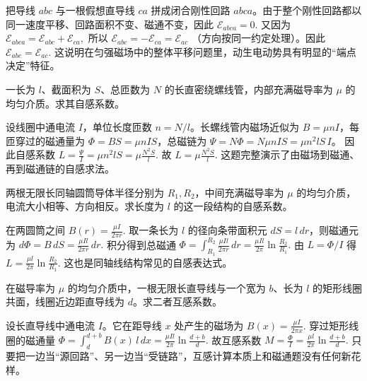 \documentclass[lang=cn,11pt]{elegantbook}
\begin{document}
\begin{solution}
把导线 \(abc\) 与一根假想直导线 \(ca\) 拼成闭合刚性回路 \(abca\)。由于整个刚性回路都以同一速度平移、回路面积不变、磁通不变，因此
 \(\mathcal{E}_{abca}=0.\) 
又因为
 \(\mathcal{E}_{abca}=\mathcal{E}_{abc}+\mathcal{E}_{ca},\) 
所以
 \(\mathcal{E}_{abc}=-\mathcal{E}_{ca}=\mathcal{E}_{ac}\) 
（方向按同一约定处理）。因此
 \(\boxed{\mathcal{E}_{abc}=\mathcal{E}_{ac}}.\) 
这说明在匀强磁场中的整体平移问题里，动生电动势具有明显的“端点决定”特征。
\end{solution}

\begin{exercise}[长直螺线管的自感系数]
一长为 \(l\)、截面积为 \(S\)、总匝数为 \(N\) 的长直密绕螺线管，内部充满磁导率为 \(\mu\) 的均匀介质。求其自感系数。
\end{exercise}

\begin{solution}
设线圈中通电流 \(I\)，单位长度匝数 \(n=N/l\)。长螺线管内磁场近似为 \(B=\mu nI\)，每匝穿过的磁通量为 \(\Phi=BS=\mu nIS\)，总磁链为 \(\Psi=N\Phi=N\mu nIS=\mu n^2lS\,I\)。
因此自感系数
 \(L=\frac{\Psi}{I}=\mu n^2lS=\mu\frac{N^2S}{l}.\) 
故
 \(\boxed{ L=\mu\frac{N^2S}{l} }.\) 
这题完整演示了由磁场到磁通、再到磁通链的自感求法。
\end{solution}

\begin{exercise}[同轴圆筒导体回路的自感系数]
两根无限长同轴圆筒导体半径分别为 \(R_1,R_2\)，中间充满磁导率为 \(\mu\) 的均匀介质，电流大小相等、方向相反。求长度为 \(l\) 的这一段结构的自感系数。
\end{exercise}

\begin{solution}
在两圆筒之间
 \(B(r)=\frac{\mu I}{2\pi r}.\) 
取一条长为 \(l\) 的径向条带面积元 \(dS=l\,dr\)，则磁通元为
 \(d\Phi=B\,dS=\frac{\mu I l}{2\pi r}\,dr.\) 
积分得到总磁通
 \(\Phi=\int_{R_1}^{R_2}\frac{\mu I l}{2\pi r}\,dr =\frac{\mu I l}{2\pi}\ln\frac{R_2}{R_1}.\) 
由 \(L=\Phi/I\) 得
 \(\boxed{ L=\frac{\mu l}{2\pi}\ln\frac{R_2}{R_1} }.\) 
这也是同轴线结构常见的自感表达式。
\end{solution}

\begin{exercise}[长直导线与矩形线圈的互感]
在磁导率为 \(\mu\) 的均匀介质中，一根无限长直导线与一个宽为 \(b\)、长为 \(l\) 的矩形线圈共面，线圈近边距直导线为 \(d\)。求二者互感系数。
\end{exercise}

\begin{solution}
设长直导线中通电流 \(I\)。它在距导线 \(x\) 处产生的磁场为
 \(B(x)=\frac{\mu I}{2\pi x}.\) 
穿过矩形线圈的磁通量
 \(\Phi=\int_d^{d+b}B(x)\,l\,dx =\frac{\mu Il}{2\pi}\ln\frac{d+b}{d}.\) 
故互感系数
 \(\boxed{ M=\frac{\Phi}{I} =\frac{\mu l}{2\pi}\ln\frac{d+b}{d} }.\) 
只要把一边当“源回路”、另一边当“受链路”，互感计算本质上和磁通题没有任何新花样。
\end{solution}
\end{document}
